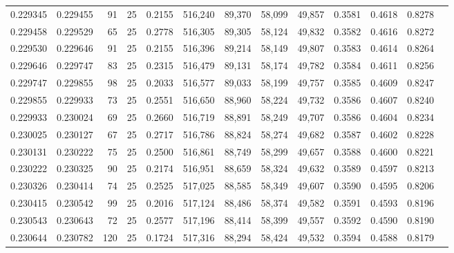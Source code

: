 \begin{tabular}{rrrrrrrrrrrrr}
0.229345 & 0.229455 &    91 &  25 &                                     0.2155 & 516,240 &  89,370 &  58,099 &  49,857 & 0.3581 & 0.4618 & 0.8278 \\
0.229458 & 0.229529 &    65 &  25 &                                     0.2778 & 516,305 &  89,305 &  58,124 &  49,832 & 0.3582 & 0.4616 & 0.8272 \\
0.229530 & 0.229646 &    91 &  25 &                                     0.2155 & 516,396 &  89,214 &  58,149 &  49,807 & 0.3583 & 0.4614 & 0.8264 \\
0.229646 & 0.229747 &    83 &  25 &                                     0.2315 & 516,479 &  89,131 &  58,174 &  49,782 & 0.3584 & 0.4611 & 0.8256 \\
0.229747 & 0.229855 &    98 &  25 &                                     0.2033 & 516,577 &  89,033 &  58,199 &  49,757 & 0.3585 & 0.4609 & 0.8247 \\
0.229855 & 0.229933 &    73 &  25 &                                     0.2551 & 516,650 &  88,960 &  58,224 &  49,732 & 0.3586 & 0.4607 & 0.8240 \\
0.229933 & 0.230024 &    69 &  25 &                                     0.2660 & 516,719 &  88,891 &  58,249 &  49,707 & 0.3586 & 0.4604 & 0.8234 \\
0.230025 & 0.230127 &    67 &  25 &                                     0.2717 & 516,786 &  88,824 &  58,274 &  49,682 & 0.3587 & 0.4602 & 0.8228 \\
0.230131 & 0.230222 &    75 &  25 &                                     0.2500 & 516,861 &  88,749 &  58,299 &  49,657 & 0.3588 & 0.4600 & 0.8221 \\
0.230222 & 0.230325 &    90 &  25 &                                     0.2174 & 516,951 &  88,659 &  58,324 &  49,632 & 0.3589 & 0.4597 & 0.8213 \\
0.230326 & 0.230414 &    74 &  25 &                                     0.2525 & 517,025 &  88,585 &  58,349 &  49,607 & 0.3590 & 0.4595 & 0.8206 \\
0.230415 & 0.230542 &    99 &  25 &                                     0.2016 & 517,124 &  88,486 &  58,374 &  49,582 & 0.3591 & 0.4593 & 0.8196 \\
0.230543 & 0.230643 &    72 &  25 &                                     0.2577 & 517,196 &  88,414 &  58,399 &  49,557 & 0.3592 & 0.4590 & 0.8190 \\
0.230644 & 0.230782 &   120 &  25 &                                     0.1724 & 517,316 &  88,294 &  58,424 &  49,532 & 0.3594 & 0.4588 & 0.8179 \\

\end{tabular}
